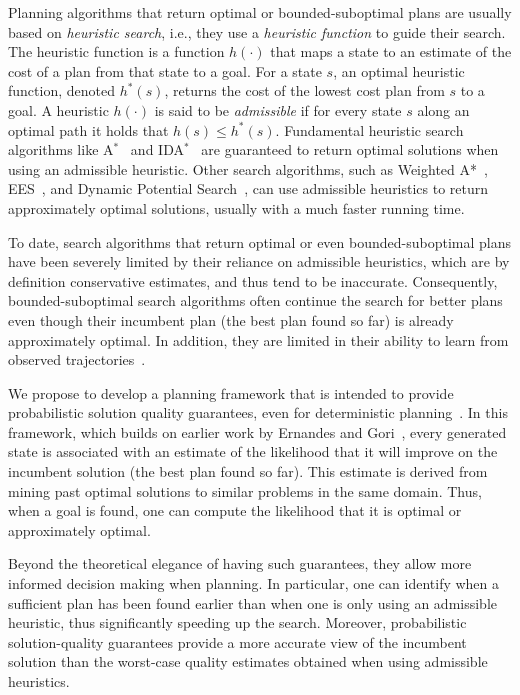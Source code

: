 \documentclass[12pt]{article}
\begin{document}
Planning algorithms that return optimal or bounded-suboptimal plans are usually based on {\em heuristic search}, i.e., they use a {\em heuristic function} to guide their search. The heuristic function is a function $h(\cdot)$ that maps a state to an estimate of the cost of a plan from that state to a goal. For a state $s$, an optimal heuristic function, denoted $h^*(s)$, returns the cost of the lowest cost plan from $s$ to a goal. A heuristic $h(\cdot)$  is said to be {\em admissible} if for every state $s$ along an optimal path it holds that $h(s)\leq h^*(s)$. Fundamental heuristic search algorithms like A$^*$~\cite{hart1968formal} and IDA$^*$~\cite{korf1985depth} are guaranteed to return optimal solutions when using an admissible heuristic. Other search algorithms, such as Weighted A*~\cite{pohl1973avoidance}, EES~\cite{thayer2011bounded}, and Dynamic Potential Search~\cite{gilon2016dynamic}, can use admissible heuristics to return approximately optimal solutions, usually with a much faster running time. 


To date, search algorithms that return optimal or even bounded-suboptimal plans have been severely limited by their reliance on admissible heuristics, which are by definition conservative estimates, and thus tend to be inaccurate. Consequently, bounded-suboptimal search algorithms often continue the search for better plans even though their incumbent plan (the best plan found so far) is already approximately optimal. In addition, they are limited in their ability to learn from observed trajectories~\cite{thayer2011bounded,phillips2012graphs}.



We propose to develop a planning framework that is intended to provide probabilistic solution quality guarantees, even for deterministic planning~\cite{stern2011probably,stern2012search}. In this framework, which builds on earlier work by Ernandes and Gori~\cite{ernandes2004likely}, every generated state is associated with an estimate of the likelihood that it will improve on the incumbent solution (the best plan found so far). This estimate is derived from mining past optimal solutions to similar problems in the same domain. Thus, when a goal is found, one can compute the likelihood that it is optimal or approximately optimal. 


Beyond the theoretical elegance of having such guarantees, they allow more informed decision making when planning. In particular, one can identify when a sufficient plan has been found earlier than when one is only using an admissible heuristic, thus significantly speeding up the search. Moreover, probabilistic solution-quality guarantees provide a more accurate view of the incumbent solution than the worst-case quality estimates obtained when using admissible heuristics. 
\end{document}
